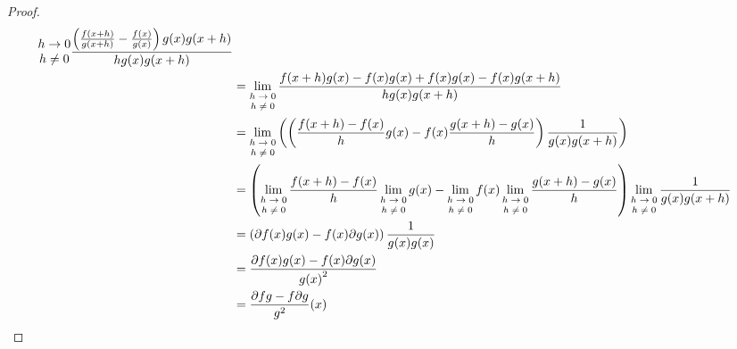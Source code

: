 \documentclass[dvipdfmx]{jsarticle}
\begin{document}
\begin{proof}
\begin{align*}
{\begin{matrix}
h \rightarrow 0 \\
h \neq 0 \\
\end{matrix}}\frac{\left( \frac{f(x + h)}{g(x + h)} - \frac{f(x)}{g(x)} \right)g(x)g(x + h)}{hg(x)g(x + h)}\\
&= \lim_{\scriptsize \begin{matrix}
h \rightarrow 0 \\
h \neq 0 \\
\end{matrix}}\frac{f(x + h)g(x) - f(x)g(x) + f(x)g(x) - f(x)g(x + h)}{hg(x)g(x + h)}\\
&= \lim_{\scriptsize \begin{matrix}
h \rightarrow 0 \\
h \neq 0 \\
\end{matrix}}\left( \left( \frac{f(x + h) - f(x)}{h}g(x) - f(x)\frac{g(x + h) - g(x)}{h} \right)\frac{1}{g(x)g(x + h)} \right)\\
&= \left( \lim_{\scriptsize \begin{matrix}
h \rightarrow 0 \\
h \neq 0 \\
\end{matrix}}\frac{f(x + h) - f(x)}{h}\lim_{\scriptsize \begin{matrix}
h \rightarrow 0 \\
h \neq 0 \\
\end{matrix}}{g(x)} - \lim_{\scriptsize \begin{matrix}
h \rightarrow 0 \\
h \neq 0 \\
\end{matrix}}{f(x)}\lim_{\scriptsize \begin{matrix}
h \rightarrow 0 \\
h \neq 0 \\
\end{matrix}}\frac{g(x + h) - g(x)}{h} \right)\lim_{\scriptsize \begin{matrix}
h \rightarrow 0 \\
h \neq 0 \\
\end{matrix}}\frac{1}{g(x)g(x + h)}\\
&= \left( \partial f(x)g(x) - f(x)\partial g(x) \right)\frac{1}{g(x)g(x)}\\
&= \frac{\partial f(x)g(x) - f(x)\partial g(x)}{{g(x)}^{2}}\\
&= \frac{\partial fg - f\partial g}{g^{2}}(x)
\end{align*}
\end{proof}
\end{document}
